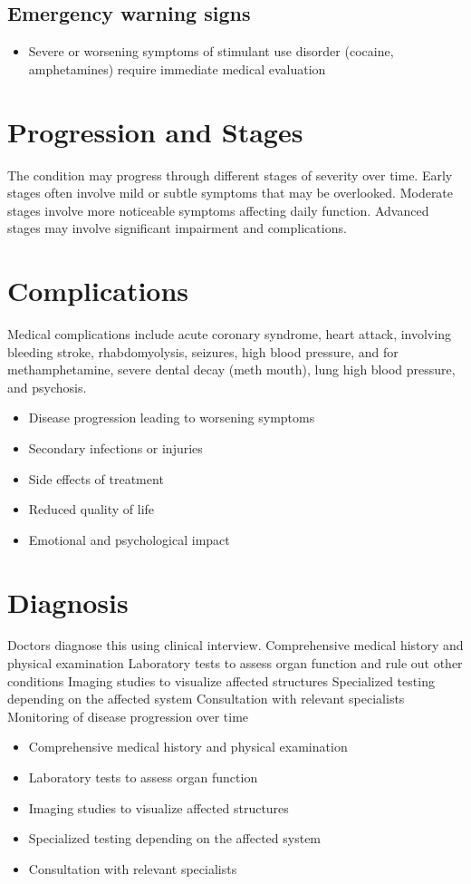 \subsection{Emergency warning signs}
\begin{itemize}[noitemsep]
  \item Severe or worsening symptoms of stimulant use disorder (cocaine, amphetamines) require immediate medical evaluation
\end{itemize}
\section{Progression and Stages}
The condition may progress through different stages of severity over time. Early stages often involve mild or subtle symptoms that may be overlooked. Moderate stages involve more noticeable symptoms affecting daily function. Advanced stages may involve significant impairment and complications.
\section{Complications}
Medical complications include acute coronary syndrome, heart attack, involving bleeding stroke, rhabdomyolysis, seizures, high blood pressure, and for methamphetamine, severe dental decay (meth mouth), lung high blood pressure, and psychosis.

\begin{itemize}[noitemsep]
  \item Disease progression leading to worsening symptoms
  \item Secondary infections or injuries
  \item Side effects of treatment
  \item Reduced quality of life
  \item Emotional and psychological impact
\end{itemize}
\section{Diagnosis}
Doctors diagnose this using clinical interview. Comprehensive medical history and physical examination Laboratory tests to assess organ function and rule out other conditions Imaging studies to visualize affected structures Specialized testing depending on the affected system Consultation with relevant specialists Monitoring of disease progression over time

\begin{itemize}[noitemsep]
  \item Comprehensive medical history and physical examination
  \item Laboratory tests to assess organ function
  \item Imaging studies to visualize affected structures
  \item Specialized testing depending on the affected system
  \item Consultation with relevant specialists
\end{itemize}
